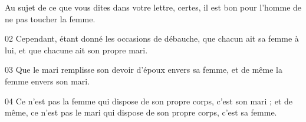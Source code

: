 Au sujet de ce que vous dites dans votre lettre, certes, il est bon pour l’homme de ne pas toucher la femme.

02 Cependant, étant donné les occasions de débauche, que chacun ait sa femme à lui, et que chacune ait son propre mari.

03 Que le mari remplisse son devoir d’époux envers sa femme, et de même la femme envers son mari.

04 Ce n’est pas la femme qui dispose de son propre corps, c’est son mari ; et de même, ce n’est pas le mari qui dispose de son propre corps, c’est sa femme.
